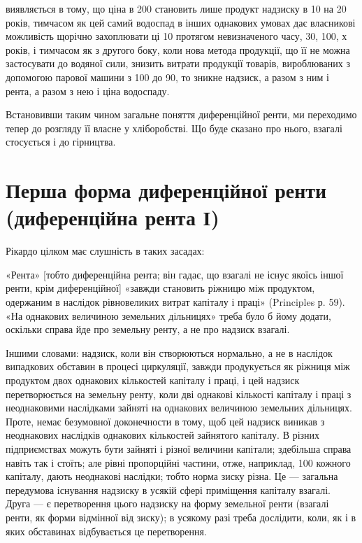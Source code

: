 \parcont{}  %
виявляється в тому, що ціна в 200 становить лише продукт надзиску
в 10 на 20 років, тимчасом як цей самий водоспад в інших однакових
умовах дає власникові можливість щорічно захоплювати ці 10 протягом
невизначеного часу, 30, 100, х років, і тимчасом як з другого боку, коли нова
метода продукції, що її не можна застосувати до водяної сили, знизить витрати
продукції товарів, вироблюваних з допомогою парової машини з 100 до 90,
то зникне надзиск, а разом з ним і рента, а разом з нею і ціна водоспаду.

Встановивши таким чином загальне поняття диференційної ренти, ми переходимо
тепер до розгляду її власне у хліборобстві. Що буде сказано про нього,
взагалі стосується і до гірництва.

\section{Перша форма диференційної ренти (диференційна рента І)}

Рікардо цілком має слушність в таких засадах:

«Рента» [тобто диференційна рента; він гадає, що взагалі не існує якоїсь
іншої ренти, крім диференційної] «завжди становить ріжницю між продуктом,
одержаним в наслідок рівновеликих витрат капіталу і праці» (Principles р. 59).
«На однакових величиною земельних дільницях» треба було б йому додати,
оскільки справа йде про земельну ренту, а не про надзиск взагалі.

Іншими словами: надзиск, коли він створюються нормально, а не в наслідок
випадкових обставин в процесі циркуляції, завжди продукується як ріжниця
між продуктом двох однакових кількостей капіталу і праці, і цей надзиск перетворюється
на земельну ренту, коли дві однакові кількості капіталу і праці з
неоднаковими наслідками зайняті на однакових величиною земельних дільницях.
Проте, немає безумовної доконечности в тому, щоб цей надзиск виникав з
неоднакових наслідків однакових кількостей зайнятого капіталу. В різних
підприємствах можуть бути зайняті і різної величини капітали; здебільша справа
навіть так і стоїть; але рівні пропорційні частини, отже, наприклад, 100 кожного
капіталу, дають неоднакові наслідки; тобто норма зиску різна. Це — загальна
передумова існування надзиску в усякій сфері приміщення капіталу взагалі.
Друга — є перетворення цього надзиску на форму земельної ренти (взагалі ренти,
як форми відмінної від зиску); в усякому разі треба дослідити, коли, як і в
яких обставинах відбувається це перетворення.

